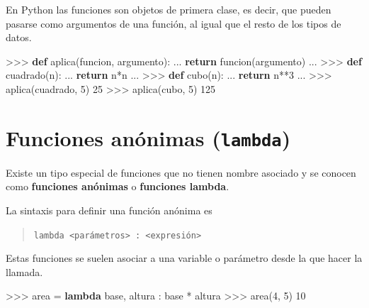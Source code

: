 \documentclass[
  spanish,
  a4paper,
]{scrreport}
\newenvironment{Shaded}{\begin{snugshade}}{\end{snugshade}}
\newcommand{\ControlFlowTok}[1]{\textcolor[rgb]{0.00,0.23,0.31}{\textbf{#1}}}
\newcommand{\DecValTok}[1]{\textcolor[rgb]{0.68,0.00,0.00}{#1}}
\newcommand{\KeywordTok}[1]{\textcolor[rgb]{0.00,0.23,0.31}{\textbf{#1}}}
\newcommand{\NormalTok}[1]{\textcolor[rgb]{0.00,0.23,0.31}{#1}}
\newcommand{\OperatorTok}[1]{\textcolor[rgb]{0.37,0.37,0.37}{#1}}
\begin{document}
En Python las funciones son objetos de primera clase, es decir, que
pueden pasarse como argumentos de una función, al igual que el resto de
los tipos de datos.

\begin{Shaded}
\begin{Highlighting}[]
\OperatorTok{\textgreater{}\textgreater{}\textgreater{}} \KeywordTok{def}\NormalTok{ aplica(funcion, argumento):}
\NormalTok{...     }\ControlFlowTok{return}\NormalTok{ funcion(argumento)}
\NormalTok{...}
\OperatorTok{\textgreater{}\textgreater{}\textgreater{}} \KeywordTok{def}\NormalTok{ cuadrado(n):}
\NormalTok{...     }\ControlFlowTok{return}\NormalTok{ n}\OperatorTok{*}\NormalTok{n}
\NormalTok{...}
\OperatorTok{\textgreater{}\textgreater{}\textgreater{}} \KeywordTok{def}\NormalTok{ cubo(n):}
\NormalTok{...     }\ControlFlowTok{return}\NormalTok{ n}\OperatorTok{**}\DecValTok{3}
\NormalTok{...}
\OperatorTok{\textgreater{}\textgreater{}\textgreater{}}\NormalTok{ aplica(cuadrado, }\DecValTok{5}\NormalTok{)}
\DecValTok{25}
\OperatorTok{\textgreater{}\textgreater{}\textgreater{}}\NormalTok{ aplica(cubo, }\DecValTok{5}\NormalTok{)}
\DecValTok{125}
\end{Highlighting}
\end{Shaded}

\section{\texorpdfstring{Funciones anónimas
(\texttt{lambda})}{Funciones anónimas (lambda)}}\label{funciones-anuxf3nimas-lambda}

Existe un tipo especial de funciones que no tienen nombre asociado y se
conocen como \textbf{funciones anónimas} o \textbf{funciones lambda}.

La sintaxis para definir una función anónima es

\begin{quote}
\texttt{lambda\ \textless{}parámetros\textgreater{}\ :\ \textless{}expresión\textgreater{}}
\end{quote}

Estas funciones se suelen asociar a una variable o parámetro desde la
que hacer la llamada.

\begin{Shaded}
\begin{Highlighting}[]
\OperatorTok{\textgreater{}\textgreater{}\textgreater{}}\NormalTok{ area }\OperatorTok{=} \KeywordTok{lambda}\NormalTok{ base, altura : base }\OperatorTok{*}\NormalTok{ altura}
\OperatorTok{\textgreater{}\textgreater{}\textgreater{}}\NormalTok{ area(}\DecValTok{4}\NormalTok{, }\DecValTok{5}\NormalTok{)}
\DecValTok{10}
\end{Highlighting}
\end{Shaded}
\end{document}
